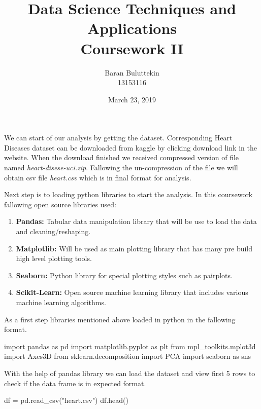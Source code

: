 \documentclass[12pt]{article}
\begin{document}
\author{Baran Buluttekin\\13153116}
\title{Data Science Techniques and Applications\\Coursework II}
\date{March 23, 2019}
\maketitle

\medskip

\indent We can start of our analysis by getting the dataset. Corresponding Heart Diseases dataset\cite{uci-source, kaggle} can be downloaded from kaggle by clicking download link in the website. When the download finished we received compressed version of file named \textit{heart-disese-uci.zip}. Fallowing the un-compression of the file we will obtain csv file \textit{heart.csv} which is in final format for analysis. 

Next step is to loading python libraries to start the analysis. In this coursework fallowing open source libraries used:
\begin{enumerate}
    \item \textbf{Pandas: }Tabular data manipulation library that will be use to load the data and cleaning/reshaping.\cite{mckinney-proc-scipy-2010}
    \item \textbf{Matplotlib: }Will be used as main plotting library that has many pre build high level plotting tools.\cite{matplotlib}
    \item \textbf{Seaborn: }Python library for special plotting styles such as pairplots.\cite{seaborn}
    \item \textbf{Scikit-Learn: }Open source machine learning library that includes various machine learning algorithms.\cite{scikit-learn}
\end{enumerate}

As a first step libraries mentioned above loaded in python in the fallowing format.

\begin{python}
    import pandas as pd
    import matplotlib.pyplot as plt
    from mpl_toolkits.mplot3d import Axes3D
    from sklearn.decomposition import PCA
    import seaborn as sns
\end{python}

With the help of pandas library we can load the dataset and view first 5 rows to check if the data frame is in expected format.

\begin{python}
    df = pd.read_csv("heart.csv")
    df.head()
\end{python}
\end{document}

